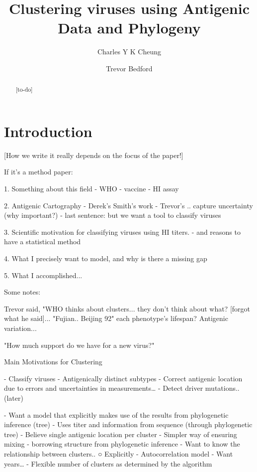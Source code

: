 \documentclass[11pt,oneside,letterpaper]{article}
\title{\vspace{1.0cm} \Large \bf 
Clustering viruses using Antigenic Data and Phylogeny
}
\author[1]{Charles Y K Cheung}
\author[1]{Trevor Bedford}
\affil[1]{Vaccine and Infectious Disease Division, Fred Hutchinson Cancer Research Center, Seattle, WA}
\date{}
\begin{document}
\maketitle

\begin{abstract}

[to-do]
\end{abstract}


\pagebreak

\section*{Introduction}

[How we write it really depends on the focus of the paper!]



If it's a method paper:

1. Something about this field
	- WHO
	- vaccine
	- HI assay


2. Antigenic Cartography
	- Derek's Smith's work
	- Trevor's .. capture uncertainty (why important?)
	- last sentence: but we want a tool to classify viruses

3. Scientific motivation for classifying viruses using HI titers.
	- and reasons to have a statistical method

4. What I precisely want to model, and why is there a missing gap

5. What I accomplished...



Some notes:

Trevor said, "WHO thinks about clusters... they don't think about what? [forgot what he said]...
"Fujian.. Beijing 92"
each phenotype's lifespan?
Antigenic variation...

"How much support do we have for a new virus?"



Main Motivations for Clustering

	- Classify viruses
	- Antigenically distinct subtypes
	- Correct antigenic location due to errors and uncertainties in measurements…
	- Detect driver mutations.. (later)

	- Want a model that explicitly makes use of the results from phylogenetic inference (tree)
	- Uses titer and information from sequence (through phylogenetic tree)
	- Believe single antigenic location per cluster
	- Simpler way of ensuring mixing - borrowing structure from phylogenetic inference
	- Want to know the relationship between clusters..
		○ Explicitly
	- Autocorrelation model
	- Want years…
	- Flexible number of clusters as determined by the algorithm
	
\end{document}
